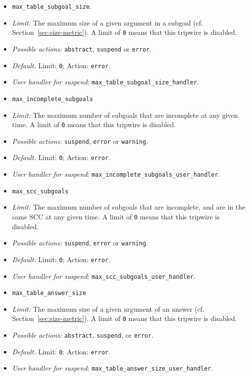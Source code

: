 \begin{itemize}

\item {\tt max\_table\_subgoal\_size}. 
\bi  
\item {\em Limit:} The maximum size of a given argument in a subgoal
 (cf. Section~\ref{sec:size-metric}).  A limit of {\tt 0} means that
 this tripwire is disabled.
\item{\em  Possible actions:} {\tt abstract}, {\tt suspend} or {\tt error}.
\item {\em Default.} Limit: {\tt 0}; Action: {\tt error}.
\item {\em User handler for suspend}: {\tt max\_table\_subgoal\_size\_handler}.
\ei

\item {\tt max\_incomplete\_subgoals}
\bi  
\item {\em Limit:} The maximum number of subgoals that are
 incomplete at any given time.  A limit of {\tt 0} means that
 this tripwire is disabled.
\item{\em  Possible actions:} {\tt suspend}, {\tt error} or {\tt warning}.
\item {\em Default.} Limit: {\tt 0}; Action: {\tt error}.
\item {\em User handler for suspend}: {\tt max\_incomplete\_subgoals\_user\_handler}.
\ei

\item {\tt max\_scc\_subgoals}
\bi  
\item {\em Limit:} The maximum number of subgoals that are incomplete,
 and are in the same SCC at any given time.  A limit of {\tt 0} means
 that this tripwire is disabled.
\item{\em  Possible actions:} {\tt suspend}, {\tt error} or {\tt warning}.
\item {\em Default.} Limit: {\tt 0}; Action: {\tt error}.
\item {\em User handler for suspend}: {\tt max\_scc\_subgoals\_user\_handler}.
\ei

\item {\tt max\_table\_answer\_size}
\bi  
\item {\em Limit:} The maximum size of a given argument of an answer
 (cf. Section~\ref{sec:size-metric}).  A limit of {\tt 0} means that
 this tripwire is disabled.
\item{\em  Possible actions:} {\tt abstract}, {\tt suspend}, or {\tt error}.
\item {\em Default.} Limit: {\tt 0}; Action: {\tt error}.
\item {\em User handler for suspend}: {\tt max\_table\_answer\_size\_user\_handler}.
\ei


\end{itemize}
